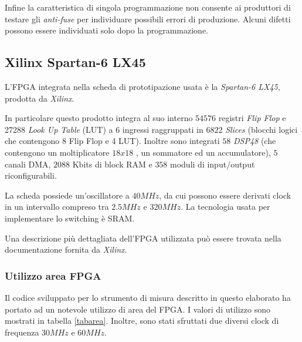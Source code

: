 Infine la caratteristica di singola programmazione non consente ai produttori di testare gli \textit{anti-fuse} per individuare possibili errori di produzione. Alcuni difetti possono essere individuati solo dopo la programmazione.

\subsection{Xilinx Spartan-6 LX45}
L'FPGA integrata nella scheda di prototipazione usata è la \textit{Spartan-6 LX45}, prodotta da \textit{Xilinx}.

In particolare questo prodotto integra al suo interno $54576$ registri \textit{Flip Flop} e 27288 \textit{Look Up Table} (LUT) a 6 ingressi raggruppati in $6822$ \textit{Slices} (blocchi logici che contengono 8 Flip Flop e 4 LUT). Inoltre sono integrati $58$ \textit{DSP48} (che contengono un moltiplicatore $18x18$ , un sommatore ed un accumulatore), $5$ canali DMA, $2088$ Kbits di block RAM e $358$ moduli di input/output riconfigurabili. 

La scheda possiede un'oscillatore a $40MHz$, da cui possono essere derivati clock in un intervallo compreso tra $2.5MHz$ e $320MHz$. La tecnologia usata per implementare lo switching è SRAM. 

Una descrizione più dettagliata dell'FPGA utilizzata può essere trovata nella documentazione fornita da \textit{Xilinx}\cite{dsxilinx}.

\subsubsection{Utilizzo area FPGA}
Il codice sviluppato per lo strumento di misura descritto in questo elaborato ha portato ad un notevole utilizzo di area del FPGA. I valori di utilizzo sono mostrati in tabella \ref{tabarea}. Inoltre, sono stati sfruttati due diversi clock di frequenza $30MHz$ e $60MHz$.

